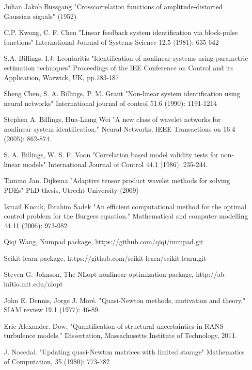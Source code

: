\documentclass[a4paper,onecolumn]{article}
\theoremstyle{remark}
\begin{document}
\begin{thebibliography}{9}
Julian Jakob Bussgang
"Crosscorrelation functions of amplitude-distorted Gaussian signals" 
(1952)

C.P. Kwong, C. F. Chen
"Linear feedback system identification via block-pulse functions"
International Journal of Systems Science 12.5 (1981): 635-642

S.A. Billings, I.J. Leontaritis
"Identification of nonlinear systems using parametric estimation techniques"
Proceedings of the IEE Conference on Control and its Application, Warwick, UK, pp.183-187

Sheng Chen, S. A. Billings, P. M. Grant
"Non-linear system identification using neural networks" 
International journal of control 51.6 (1990): 1191-1214

Stephen A. Billings, Hua-Liang Wei
"A new class of wavelet networks for nonlinear system identification."
Neural Networks, IEEE Transactions on 16.4 (2005): 862-874.

S. A. Billings, W. S. F. Voon
"Correlation based model validity tests for non-linear models"
International Journal of Control 44.1 (1986): 235-244.

Tammo Jan. Dijkema
"Adaptive tensor product wavelet methods for solving PDEs"
PhD thesis, Utrecht University (2009)

Ismail Kucuk,  Ibrahim Sadek
"An efficient computational method for the optimal control problem for the Burgers equation." 
Mathematical and computer modelling 44.11 (2006): 973-982.

Qiqi Wang,
Numpad package,
https://github.com/qiqi/numpad.git

Scikit-learn package,
https://github.com/scikit-learn/scikit-learn.git

Steven G. Johnson,
The NLopt nonlinear-optimization package, 
http://ab-initio.mit.edu/nlopt

John E. Dennis, Jorge J. Moré.
"Quasi-Newton methods, motivation and theory." SIAM review 19.1 (1977): 46-89.

Eric Alexander. Dow,
"Quantification of structural uncertainties in RANS turbulence models."
Dissertation, Massachusetts Institute of Technology, 2011.

J. Nocedal.
"Updating quasi-Newton matrices with limited storage"
Mathematics of Computation, 35 (1980): 773-782


\end{thebibliography}
\end{document}
